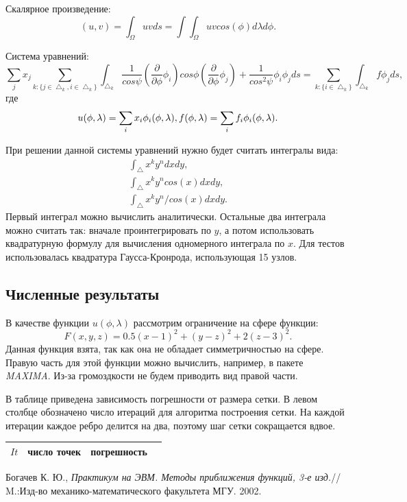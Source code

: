 \documentclass[a4paper,article]{article}
\begin{document}
Скалярное произведение:
\begin{equation*}
(u, v) = \int_\Omega u v ds = \int\int_\Omega u v cos(\phi)d\lambda d\phi.
\end{equation*}

Система уравнений:
\begin{equation*}
\sum_j x_j \sum_{k: \{j\in\bigtriangleup_k,
  i\in\bigtriangleup_k\}}\int_{\bigtriangleup_k}\frac{1}{cos\psi}(\frac{\partial}{\partial
  \phi} \phi_i) cos\phi (\frac{\partial}{\partial \phi}
\phi_j)+\frac{1}{cos^2\psi}\phi_i\phi_j ds =
\sum_{k:\{i\in\bigtriangleup_k\}}\int_{\bigtriangleup_k}f \phi_j ds, 
\end{equation*}
где
\begin{equation*}
u(\phi,\lambda)=\sum_i x_i \phi_i(\phi, \lambda),\\
f(\phi,\lambda)=\sum_i f_i \phi_i(\phi, \lambda).
\end{equation*}

При решении данной системы уравнений нужно будет считать интегралы вида:
\begin{equation*}
\begin{split}
\int_\bigtriangleup x^k y^n dx dy,\\
\int_\bigtriangleup x^k y^n cos(x) dx dy,\\
\int_\bigtriangleup x^k y^n / cos(x) dx dy.
\end{split}
\end{equation*}
Первый интеграл можно вычислить аналитически. Остальные два интеграла
можно считать так: вначале проинтегрировать по $y$, а потом использовать
квадратурную формулу для вычисления одномерного интеграла по $x$. Для
тестов использовалась квадратура Гаусса-Кронрода, использующая 15
узлов.

\subsection{Численные результаты}
В качестве функции $u(\phi,\lambda)$ рассмотрим ограничение на сфере
функции:
\begin{equation*}
F(x,y,z)=0.5(x-1)^2+(y-z)^2+2(z-3)^2.
\end{equation*}
Данная функция взята, так как она не обладает симметричностью на
сфере. Правую часть для этой функции можно вычислить, например, в
пакете {\it MAXIMA}. Из-за громоздкости не будем приводить вид правой части.

В таблице приведена зависимость погрешности от размера сетки. В левом
столбце обозначено число итераций для алгоритма построения сетки. На
каждой итерации каждое ребро делится на два, поэтому шаг сетки
сокращается вдвое.
\begin{center}
\begin{tabular}{| c | c | c | c |}
$It$ & число точек & погрешность \\
\hline
\hline
\end{tabular}
\end{center}

\begin{thebibliography}{999}
 Богачев К. Ю., {\it  Практикум на ЭВМ.  Методы
    приближения функций, 3-е изд.}// M.:Изд-во
  механико-математического факультета МГУ. 2002.

\end{thebibliography}
\end{document}
